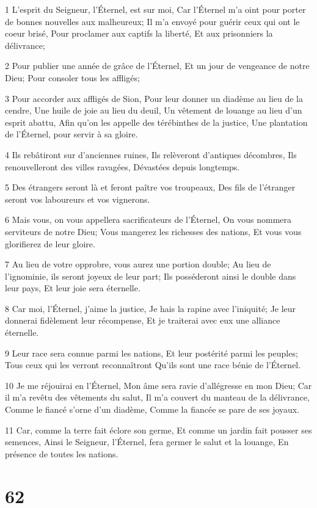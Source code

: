\par 1 L'esprit du Seigneur, l'Éternel, est sur moi, Car l'Éternel m'a oint pour porter de bonnes nouvelles aux malheureux; Il m'a envoyé pour guérir ceux qui ont le coeur brisé, Pour proclamer aux captifs la liberté, Et aux prisonniers la délivrance;
\par 2 Pour publier une année de grâce de l'Éternel, Et un jour de vengeance de notre Dieu; Pour consoler tous les affligés;
\par 3 Pour accorder aux affligés de Sion, Pour leur donner un diadème au lieu de la cendre, Une huile de joie au lieu du deuil, Un vêtement de louange au lieu d'un esprit abattu, Afin qu'on les appelle des térébinthes de la justice, Une plantation de l'Éternel, pour servir à sa gloire.
\par 4 Ils rebâtiront sur d'anciennes ruines, Ils relèveront d'antiques décombres, Ils renouvelleront des villes ravagées, Dévastées depuis longtemps.
\par 5 Des étrangers seront là et feront paître vos troupeaux, Des fils de l'étranger seront vos laboureurs et vos vignerons.
\par 6 Mais vous, on vous appellera sacrificateurs de l'Éternel, On vous nommera serviteurs de notre Dieu; Vous mangerez les richesses des nations, Et vous vous glorifierez de leur gloire.
\par 7 Au lieu de votre opprobre, vous aurez une portion double; Au lieu de l'ignominie, ils seront joyeux de leur part; Ils posséderont ainsi le double dans leur pays, Et leur joie sera éternelle.
\par 8 Car moi, l'Éternel, j'aime la justice, Je hais la rapine avec l'iniquité; Je leur donnerai fidèlement leur récompense, Et je traiterai avec eux une alliance éternelle.
\par 9 Leur race sera connue parmi les nations, Et leur postérité parmi les peuples; Tous ceux qui les verront reconnaîtront Qu'ils sont une race bénie de l'Éternel.
\par 10 Je me réjouirai en l'Éternel, Mon âme sera ravie d'allégresse en mon Dieu; Car il m'a revêtu des vêtements du salut, Il m'a couvert du manteau de la délivrance, Comme le fiancé s'orne d'un diadème, Comme la fiancée se pare de ses joyaux.
\par 11 Car, comme la terre fait éclore son germe, Et comme un jardin fait pousser ses semences, Ainsi le Seigneur, l'Éternel, fera germer le salut et la louange, En présence de toutes les nations.

\chapter{62}

